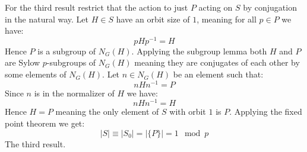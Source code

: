 For the third result restrict that the action to just $P$ acting on $S$ by conjugation in the natural way.
Let $H\in S$ have an orbit size of $1$,
meaning for all $p\in P$ we have:
\[pHp^{-1}=H\]
Hence $P$ is a subgroup of $N_G(H)$.
Applying the subgroup lemma both $H$ and $P$ are Sylow $p$-subgroups of $N_G(H)$ meaning they are conjugates of each other by some elements of $N_G(H)$.
Let $n\in N_G(H)$ be an element such that:
\[nHn^{-1}=P\]
Since $n$ is in the normalizer of $H$ we have:
\[nHn^{-1}=H\]
Hence $H=P$ meaning the only element of $S$ with orbit $1$ is $P$.
Applying the fixed point theorem we get:
\[|S|\equiv |S_0| = |\{P\}| = 1 \mod p\]
The third result.
